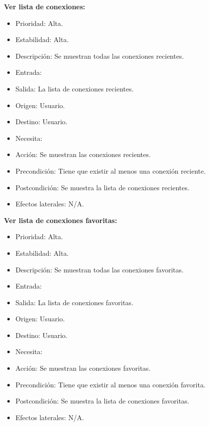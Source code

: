 \textbf{Ver lista de conexiones:}
\begin{itemize}
\item Prioridad: Alta.
\item Estabilidad: Alta.
\item Descripción: Se muestran todas las conexiones recientes.
\item Entrada:
\item Salida: La lista de conexiones recientes.
\item Origen: Usuario.
\item Destino: Usuario.
\item Necesita:
\item Acción: Se muestran las conexiones recientes.
\item Precondición: Tiene que existir al menos una conexión reciente.
\item Postcondición: Se muestra la lista de conexiones recientes.
\item Efectos laterales: N/A.\\

\end{itemize}

\textbf{Ver lista de conexiones favoritas:}
\begin{itemize}
\item Prioridad: Alta.
\item Estabilidad: Alta.
\item Descripción: Se muestran todas las conexiones favoritas.
\item Entrada:
\item Salida: La lista de conexiones favoritas.
\item Origen: Usuario.
\item Destino: Usuario.
\item Necesita:
\item Acción: Se muestran las conexiones favoritas.
\item Precondición: Tiene que existir al menos una conexión favorita.
\item Postcondición: Se muestra la lista de conexiones favoritas.
\item Efectos laterales: N/A.\\

\end{itemize}

